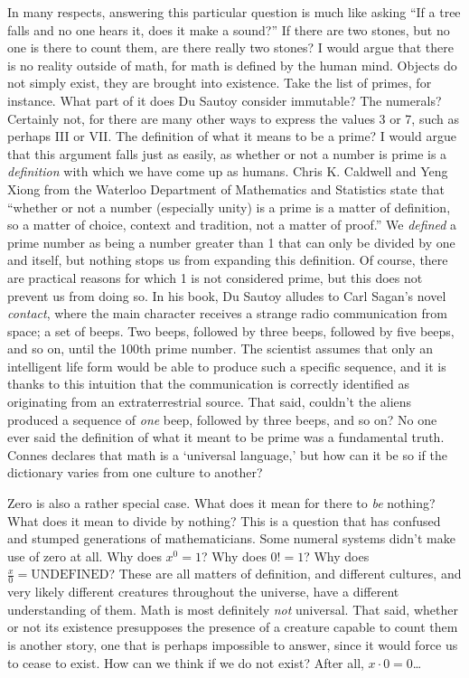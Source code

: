 \documentclass{mathbook}
\begin{document}
    In many respects, answering this particular question is much like asking ``If a tree falls and no one hears it, does it make a sound?'' If there are two stones, but no one is there to count them, are there really two stones? I would argue that there is no reality outside of math, for math is defined by the human mind. Objects do not simply exist, they are brought into existence. Take the list of primes, for instance. What part of it does Du Sautoy consider immutable? The numerals? Certainly not, for there are many other ways to express the values 3 or 7, such as perhaps III or VII. The definition of what it means to be a prime? I would argue that this argument falls just as easily, as whether or not a number is prime is a \emph{definition} with which we have come up as humans. Chris K. Caldwell and Yeng Xiong from the Waterloo Department of Mathematics and Statistics state that ``whether or not a number (especially unity) is a prime is a matter of definition, so a matter of choice, context and tradition, not a matter of proof.'' \cite{Caldwell2012} We \emph{defined} a prime number as being a number greater than 1 that can only be divided by one and itself, but nothing stops us from expanding this definition. Of course, there are practical reasons for which 1 is not considered prime, but this does not prevent us from doing so. In his book, Du Sautoy alludes to Carl Sagan's novel \emph{contact}, where the main character receives a strange radio communication from space; a set of beeps. Two beeps, followed by three beeps, followed by five beeps, and so on, until the 100th prime number. The scientist assumes that only an intelligent life form would be able to produce such a specific sequence, and it is thanks to this intuition that the communication is correctly identified as originating from an extraterrestrial source. That said, couldn't the aliens produced a sequence of \emph{one} beep, followed by three beeps, and so on? No one ever said the definition of what it meant to be prime was a fundamental truth. Connes declares that math is a `universal language,' but how can it be so if the dictionary varies from one culture to another?

    Zero is also a rather special case. What does it mean for there to \emph{be} nothing? What does it mean to divide by nothing? This is a question that has confused and stumped generations of mathematicians. Some numeral systems didn't make use of zero at all. Why does $x^0=1$? Why does $0!=1$? Why does $\frac{x}{0}=\text{UNDEFINED}$? These are all matters of definition, and different cultures, and very likely different creatures throughout the universe, have a different understanding of them. Math is most definitely \emph{not} universal. That said, whether or not its existence presupposes the presence of a creature capable to count them is another story, one that is perhaps impossible to answer, since it would force us to cease to exist. How can we think if we do not exist? After all, \(x \cdot 0 = 0\)\dots
\end{document}
